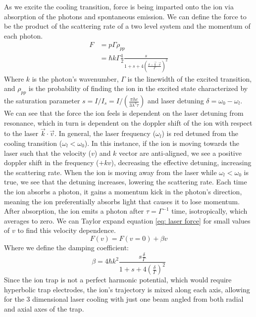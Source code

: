 As we excite the cooling transition, force is being imparted onto the ion via absorption of the photons and spontaneous emission. We can define the force to be the product of the scattering rate of a two level system and the momentum of each photon.
\begin{align}
	F & = p \Gamma \rho_{pp} \nonumber \\
	& = \hbar k \Gamma \frac{1}{2} \frac{s}{1+s+4\left(\frac{\delta-\vec{k}\cdot \vec{v}}{\Gamma}\right)^2} \label{eq: laser force}
\end{align}
Where $k$ is the photon's wavenumber, $\Gamma$ is the linewidth of the excited transition, and $\rho_{pp}$ is the probability of finding the ion in the excited  state characterized by the saturation parameter $s = I/I_s=I/(\frac{\pi h c}{3 \lambda^3 \tau})$ and laser detuning $\delta=\omega_0-\omega_l$. We can see that the force the ion feels is dependent on the laser detuning from resonance, which in turn is dependent on the doppler shift of the ion with respect to the laser $\vec{k} \cdot \vec{v}$. In general, the laser frequency ($\omega_l$) is red detuned from the cooling transition ($\omega_l < \omega_0$). In this instance, if the ion is moving towards the laser such that the velocity ($v$) and $k$ vector are anti-aligned, we see a positive doppler shift in the frequency ($+kv$), decreasing the effective detuning, increasing the scattering rate. When the ion is moving away from the laser while $\omega_l < \omega_0$ is true, we see that the detuning increases, lowering the scattering rate. Each time the ion absorbs a photon, it gains a momentum kick in the photon's direction, meaning the ion preferentially absorbs light that causes it to lose momentum. After absorption, the ion emits a photon after $\tau=\Gamma^{-1}$ time, isotropically, which averages to zero. We can Taylor expand equation \ref{eq: laser force} for small values of $v$ to find this velocity dependence.
\begin{equation*}
	F(v) = F(v=0) + \beta v
\end{equation*}
Where we define the damping coefficient:
\begin{equation*}
	\beta= 4 \hbar k^2 \frac{s \frac{\delta}{\Gamma}}{1+s+4\left(\frac{\delta}{\Gamma}\right)^2}
\end{equation*}
Since the ion trap is not a perfect harmonic potential, which would require hyperbolic trap electrodes, the ion's trajectory is mixed along each axis, allowing for the 3 dimensional laser cooling with just one beam angled from both radial and axial axes of the trap.